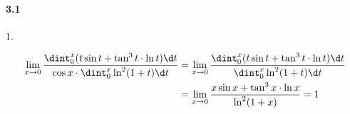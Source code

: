 \paragraph*{3.1} $1$.

\[
	\begin{aligned}
	\lim_{x \to 0}\dfrac{\dint_{0}^x (t\sin t + \tan^3 t \cdot \ln t) \d t}{\cos x \cdot \dint_{0}^{x} \ln^2 (1 + t) \d t}&=\lim_{x \to 0}\dfrac{\dint_{0}^{x} (t \sin t + \tan^3 t \cdot \ln t) \d t}{\dint_{0}^{x} \ln^2 (1 + t) \d t}\\
	&=\lim_{x \to 0} \dfrac{x \sin x + \tan^3 x \cdot \ln x}{\ln^2 (1 + x)}=1
	\end{aligned}
\]